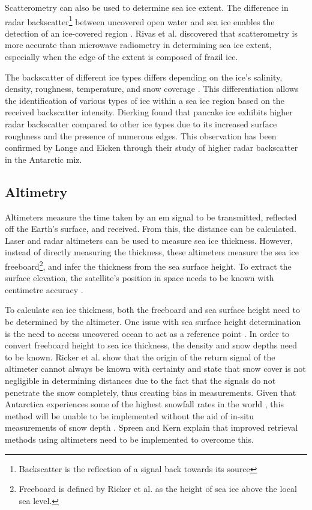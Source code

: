 Scatterometry can also be used to determine sea ice extent. The difference in radar backscatter\footnote{Backscatter is the reflection of a signal back towards its source} between uncovered open water and sea ice enables the detection of an ice-covered region \cite{Thomas2017Chap9}. Rivas et al. \cite{Rivas2018} discovered that scatterometry is more accurate than microwave radiometry in determining sea ice extent, especially when the edge of the extent is composed of frazil ice.

The backscatter of different ice types differs depending on the ice's salinity, density, roughness, temperature, and snow coverage \cite{Thomas2017Chap9}. This differentiation allows the identification of various types of ice within a sea ice region based on the received backscatter intensity. Dierking \cite{Dierking2001} found that pancake ice exhibits higher radar backscatter compared to other ice types due to its increased surface roughness and the presence of numerous edges. This observation has been confirmed by Lange and Eicken \cite{Lange1991} through their study of higher radar backscatter in the Antarctic \acs{miz}.

\subsection{Altimetry} \label{subsec:litReview.seaIceCharac.altimetry}

Altimeters measure the time taken by an \acs{em} signal to be transmitted, reflected off the Earth's surface, and received. From this, the distance can be calculated. Laser and radar altimeters can be used to measure sea ice thickness. However, instead of directly measuring the thickness, these altimeters measure the sea ice freeboard\footnote{Freeboard is defined by Ricker et al. \cite{Ricker2015} as the height of sea ice above the local sea level.}, and infer the thickness from the sea surface height. To extract the surface elevation, the satellite's position in space needs to be known with centimetre accuracy \cite{Thomas2017Chap9}.

To calculate sea ice thickness, both the freeboard and sea surface height need to be determined by the altimeter. One issue with sea surface height determination is the need to access uncovered ocean to act as a reference point \cite{Thomas2017Chap9}. In order to convert freeboard height to sea ice thickness, the density and snow depths need to be known. Ricker et al. \cite{Ricker2015} show that the origin of the return signal of the altimeter cannot always be known with certainty and state that snow cover is not negligible in determining distances due to the fact that the signals do not penetrate the snow completely, thus creating bias in measurements. Given that Antarctica experiences some of the highest snowfall rates in the world \cite{Maksym2012}, this method will be unable to be implemented without the aid of in-situ measurements of snow depth \cite{Ricker2015}. Spreen and Kern \cite{Thomas2017Chap9} explain that improved retrieval methods using altimeters need to be implemented to overcome this.

